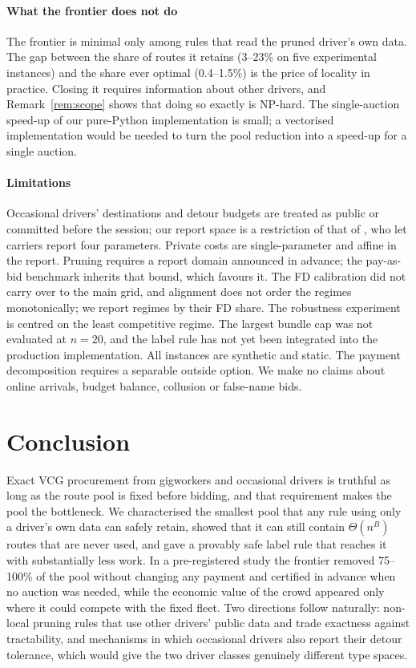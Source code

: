 \documentclass[review,12pt]{elsarticle}
\theoremstyle{definition}
\theoremstyle{remark}
\begin{document}
\paragraph{What the frontier does not do} The frontier is minimal only among
rules that read the pruned driver's own data. The gap between the share of
routes it retains (3--23\% on five experimental instances) and the share
ever optimal (0.4--1.5\%) is the price of locality in practice. Closing it
requires information about other drivers, and Remark~\ref{rem:scope} shows
that doing so exactly is NP-hard. The single-auction speed-up of our
pure-Python implementation is small; a vectorised implementation would be
needed to turn the pool reduction into a speed-up for a single auction.

\paragraph{Limitations} Occasional drivers' destinations and detour budgets
are treated as public or committed before the session; our report space is
a restriction of that of \citet{li2026auction}, who let carriers report
four parameters. Private costs are single-parameter and affine in the
report. Pruning requires a report domain announced in advance; the
pay-as-bid benchmark inherits that bound, which favours it. The FD
calibration did not carry over to the main grid, and alignment does not
order the regimes monotonically; we report regimes by their FD share. The
robustness experiment is centred on the least competitive regime. The
largest bundle cap was not evaluated at $n=20$, and the label rule has not
yet been integrated into the production implementation. All instances are
synthetic and static. The payment decomposition requires a separable
outside option. We make no claims about online arrivals, budget balance,
collusion or false-name bids.

\section{Conclusion}
\label{sec:conclusion}

Exact VCG procurement from gigworkers and occasional drivers is truthful as
long as the route pool is fixed before bidding, and that requirement makes
the pool the bottleneck. We characterised the smallest pool that any rule
using only a driver's own data can safely retain, showed that it can still
contain $\Theta(n^B)$ routes that are never used, and gave a provably safe
label rule that reaches it with substantially less work. In a pre-registered
study the frontier removed 75--100\% of the pool without changing any
payment and certified in advance when no auction was needed, while the
economic value of the crowd appeared only where it could compete with the
fixed fleet. Two directions follow naturally: non-local pruning rules that
use other drivers' public data and trade exactness against tractability,
and mechanisms in which occasional drivers also report their detour
tolerance, which would give the two driver classes genuinely different type
spaces.
\end{document}
